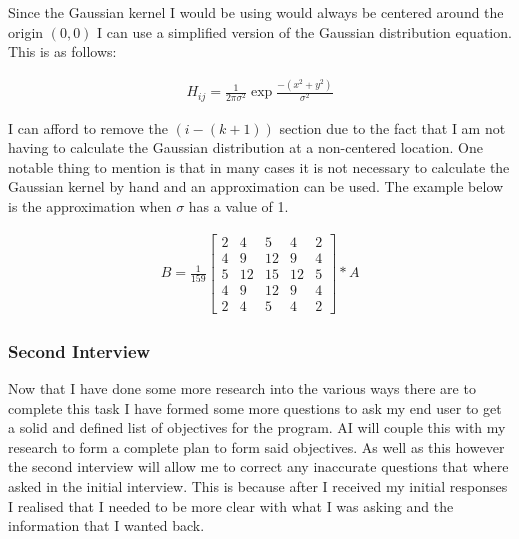 \begin{flushleft}
            \BK
            Since the Gaussian kernel I would be using would always be centered around the origin $(0, 0)$ I can use a simplified version of the Gaussian distribution equation. This is as follows: \\ \bk
            
            \begin{gather*}
                H_{ij} = \frac{1}{2\pi\sigma^2} \exp \frac{-(x^2 + y^2)}{\sigma^2}
            \end{gather*}
            
            \BK
            I can afford to remove the $(i - (k + 1))$ section due to the fact that I am not having to calculate the Gaussian distribution at a non-centered location. One notable thing to mention is that in many cases it is not necessary to calculate the Gaussian kernel by hand and an approximation can be used. The example below is the approximation when $\sigma$ has a value of 1. \\ \bk
            
            \begin{gather*}
                B = \frac{1}{159} \begin{bmatrix} 
                2 & 4 & 5 & 4 & 2\\
                4 & 9 & 12 & 9 & 4\\
                5 & 12 & 15 & 12 & 5\\
                4 & 9 & 12 & 9 & 4\\
                2 & 4 & 5 & 4 & 2
                \end{bmatrix} * A
            \end{gather*}
            \bk
            
            \paragraph{}

            \subsubsection{Second Interview}
            \large
            Now that I have done some more research into the various ways there are to complete this task I have formed some more questions to ask my end user to get a solid and
            defined list of objectives for the program. AI will couple this with my research to form a complete plan to form said objectives. As well as this however the second interview
            will allow me to correct any inaccurate questions that where asked in the initial interview. This is because after I received my initial responses I realised that I
            needed to be more clear with what I was asking and the information that I wanted back. \\
            \bk
            

\end{flushleft}
